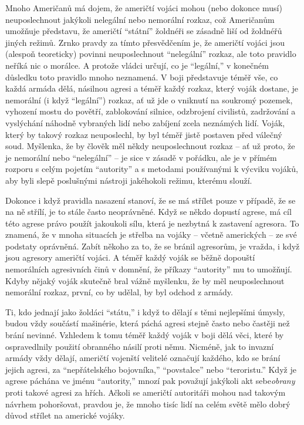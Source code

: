 \documentclass{book}
\begin{document}
Mnoho Američanů má dojem, že američtí vojáci mohou (nebo dokonce musí) neuposlechnout jakýkoli nelegální nebo nemorální rozkaz, což Američanům umožňuje představu, že američtí \enquote{státní} žoldnéři se zásadně liší od žoldnéřů jiných režimů. Zrnko pravdy za tímto přesvědčením je, že američtí vojáci jsou (alespoň teoreticky) povinni neuposlechnout \enquote{nelegální} rozkaz, ale toto pravidlo neříká nic o morálce. A protože vládci určují, co je \enquote{legální,} v konečném důsledku toto pravidlo mnoho neznamená. V boji představuje téměř vše, co každá armáda dělá, násilnou agresi a téměř každý rozkaz, který voják dostane, je nemorální (i když \enquote{legální}) rozkaz, ať už jde o vniknutí na soukromý pozemek, vyhození mostu do povětří, zablokování silnice, odzbrojení civilistů, zadržování a vyslýchání náhodně vybraných lidí nebo zabíjení zcela neznámých lidí. Voják, který by takový rozkaz neuposlechl, by byl téměř jistě postaven před válečný soud. Myšlenka, že by člověk měl někdy neuposlechnout rozkaz -- ať už proto, že je nemorální nebo \enquote{nelegální} -- je sice v zásadě v pořádku, ale je v přímém rozporu s celým pojetím \enquote{autority} a s metodami používanými k výcviku vojáků, aby byli slepě poslušnými nástroji jakéhokoli režimu, kterému slouží.

Dokonce i když pravidla nasazení stanoví, že se má střílet pouze v případě, že se na ně střílí, je to stále často neoprávněné. Když se někdo dopustí agrese, má cíl této agrese právo použít jakoukoli sílu, která je nezbytná k zastavení agresora. To znamená, že v mnoha situacích je střelba na vojáky -- včetně amerických -- ze své podstaty oprávněná. Zabít někoho za to, že se bránil agresorům, je vražda, i když jsou agresory američtí vojáci. A téměř každý voják se běžně dopouští nemorálních agresivních činů v domnění, že příkazy \enquote{autority} mu to umožňují. Kdyby nějaký voják skutečně bral vážně myšlenku, že by měl neuposlechnout nemorální rozkaz, první, co by udělal, by byl odchod z armády.

Ti, kdo jednají jako žoldáci \enquote{státu,} i když to dělají s těmi nejlepšími úmysly, budou vždy součástí mašinérie, která páchá agresi stejně často nebo častěji než brání nevinné. Vzhledem k tomu téměř každý voják v boji dělá věci, které by ospravedlnily použití obranného násilí proti němu. Nicméně, jak to invazní armády vždy dělají, američtí vojenští velitelé označují každého, kdo se brání jejich agresi, za \enquote{nepřátelského bojovníka,} \enquote{povstalce} nebo \enquote{teroristu.} Když je agrese páchána ve jménu \enquote{autority,} mnozí pak považují jakýkoli akt sebe\emph{obrany} proti takové agresi za hřích. Ačkoli se američtí autoritáři mohou nad takovým návrhem pohoršovat, pravdou je, že mnoho tisíc lidí na celém světě mělo dobrý důvod střílet na americké vojáky.
\end{document}
